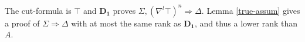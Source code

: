 The cut-formula is $\top$ and $\mathbf{D_1}$ proves $\Sigma , (\nabla^l \top)^n \Rightarrow \Delta$. Lemma \ref{true-assum} gives a proof of $\Sigma \Rightarrow \Delta$ with at most the same rank as $\mathbf{D_1}$, and thus a lower rank than $A$.